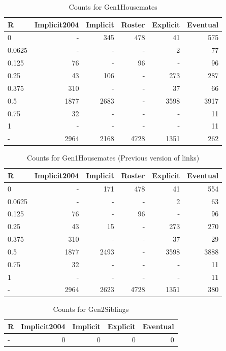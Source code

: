 \documentclass[a4paper]{article}\usepackage{graphicx, color}
\begin{document}
\begin{table}[ht]
\centering
{\large
\begin{tabular}{lrrrrr}
  \hline
R & Implicit2004 & Implicit & Roster & Explicit & Eventual \\ 
  \hline
0 & - & 345 & 478 &  41 & 575 \\ 
  0.0625 & - & - & - &   2 &  77 \\ 
  0.125 &  76 & - &  96 & - &  96 \\ 
  0.25 &  43 & 106 & - & 273 & 287 \\ 
  0.375 & 310 & - & - &  37 &  66 \\ 
  0.5 & 1877 & 2683 & - & 3598 & 3917 \\ 
  0.75 &  32 & - & - & - &  11 \\ 
  1 & - & - & - & - &  11 \\ 
  - & 2964 & 2168 & 4728 & 1351 & 262 \\ 
   \hline
\end{tabular}
}
\caption{Counts for Gen1Housemates} 
\end{table}
\begin{table}[ht]
\centering
{\large
\begin{tabular}{lrrrrr}
  \hline
R & Implicit2004 & Implicit & Roster & Explicit & Eventual \\ 
  \hline
0 & - & 171 & 478 &  41 & 554 \\ 
  0.0625 & - & - & - &   2 &  63 \\ 
  0.125 &  76 & - &  96 & - &  96 \\ 
  0.25 &  43 &  15 & - & 273 & 270 \\ 
  0.375 & 310 & - & - &  37 &  29 \\ 
  0.5 & 1877 & 2493 & - & 3598 & 3888 \\ 
  0.75 &  32 & - & - & - &  11 \\ 
  1 & - & - & - & - &  11 \\ 
  - & 2964 & 2623 & 4728 & 1351 & 380 \\ 
   \hline
\end{tabular}
}
\caption{Counts for Gen1Housemates (Previous version of links)} 
\end{table}
\begin{table}[ht]
\centering
{\large
\begin{tabular}{lrrrr}
  \hline
R & Implicit2004 & Implicit & Explicit & Eventual \\ 
  \hline
- &   0 &   0 &   0 &   0 \\ 
   \hline
\end{tabular}
}
\caption{Counts for Gen2Siblings} 
\end{table}
\end{document}
